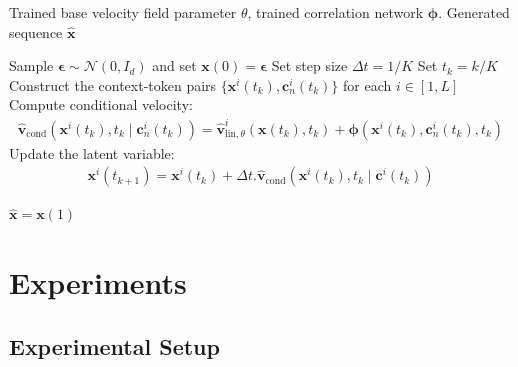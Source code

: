 \documentclass{article} %
\begin{document}
\begin{algorithm}[t]
\caption{Inference Algorithm}
\label{alg:inference}
\begin{algorithmic}[1]
\Require Trained base velocity field parameter $\theta$, trained correlation network $\boldsymbol{\phi}$.
\Ensure Generated sequence $\widehat{\mathbf{x}}$

\State Sample $\boldsymbol{\epsilon} \sim \mathcal{N}(0, I_{d})$ and set $\mathbf{x}(0) = \boldsymbol{\epsilon}$  
\State Set step size $\Delta t = 1/K$
    \State Set $t_k = k/K$
    \State Construct the context-token pairs $\{\mathbf{x}^{i}(t_k), \mathbf{c}_n^{i}(t_k) \}$ for each $i \in [1, L]$
    \State Compute conditional velocity:
        \begin{eqnarray}
             \hat{\mathbf{v}}_{\text{cond}} (\mathbf{x}^i(t_k),t_k  \mid \mathbf{c}_n^{i}(t_k)) = \hat{\mathbf{v}}^{i}_{\text{lin},\theta} (\mathbf{x}(t_k), t_k) + \boldsymbol{\phi}(\mathbf{x}^i(t_k), \mathbf{c}_n^i(t_k) ,t_k) \nonumber
        \end{eqnarray}
    \State Update the latent variable:
    \begin{eqnarray}
        \mathbf{x}^{i}(t_{k+1}) = \mathbf{x}^{i}(t_k) + \Delta t . \hat{\mathbf{v}}_{\text{cond}} (\mathbf{x}^i(t_k),t_k  \mid \mathbf{c}^{i}(t_k)) \nonumber
    \end{eqnarray}
\EndFor

\State \Return $\widehat{\mathbf{x}} = \mathbf{x}(1)$
\end{algorithmic}
\end{algorithm}





\section{Experiments}
\label{sec:experiments}

\subsection{Experimental Setup}
\label{sec:experimental_setup}
\end{document}
